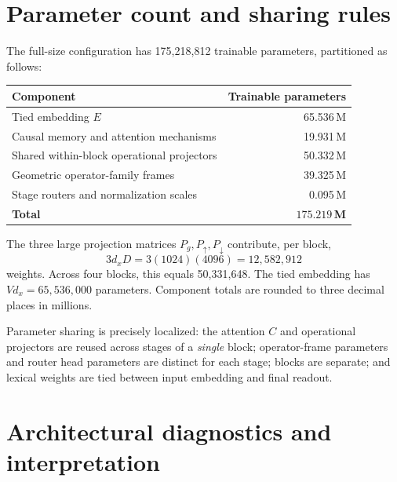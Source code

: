 \documentclass[11pt,a4paper]{article}
\newcommand{\up}{{\uparrow}}
\newcommand{\dn}{{\downarrow}}
\begin{document}
\section{Parameter count and sharing rules}

The full-size configuration has 175{,}218{,}812 trainable parameters, partitioned as follows:
\begin{center}
\begin{tabular}{lr}
\toprule
Component & Trainable parameters\\
\midrule
Tied embedding $E$ & 65.536\,M\\
Causal memory and attention mechanisms & 19.931\,M\\
Shared within-block operational projectors & 50.332\,M\\
Geometric operator-family frames & 39.325\,M\\
Stage routers and normalization scales & 0.095\,M\\
\midrule
\textbf{Total} & $\mathbf{175.219}$\,\textbf{M}\\
\bottomrule
\end{tabular}
\end{center}
The three large projection matrices $P_g,P_\up,P_\dn$ contribute, per block,
\begin{equation}
3d_xD=3(1024)(4096)=12{,}582{,}912
\end{equation}
weights. Across four blocks, this equals 50{,}331{,}648. The tied embedding has $Vd_x=65{,}536{,}000$
parameters. Component totals are rounded to three decimal places in millions.

Parameter sharing is precisely localized: the attention $C$ and operational projectors are reused across
stages of a \emph{single} block; operator-frame parameters and router head parameters are distinct for each
stage; blocks are separate; and lexical weights are tied between input embedding and final readout.

\section{Architectural diagnostics and interpretation}
\end{document}
